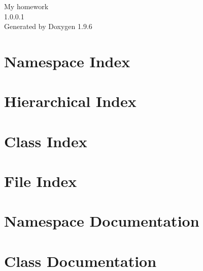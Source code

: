 \documentclass[twoside]{book}
\newcommand{\+}{\discretionary{\mbox{\scriptsize$\hookleftarrow$}}{}{}}
\newcommand{\clearemptydoublepage}{%
    \newpage{\pagestyle{empty}\cleardoublepage}%
  }
\begin{document}
  \raggedbottom
    \hypersetup{pageanchor=false,
                bookmarksnumbered=true,
                pdfencoding=unicode
               }
  \begin{titlepage}
  \vspace*{7cm}
  \begin{center}%
  {\Large My homework}\\
  [1ex]\large 1.\+0.\+0.\+1 \\
  \vspace*{1cm}
  {\large Generated by Doxygen 1.9.6}\\
  \end{center}
  \end{titlepage}
  \clearemptydoublepage
  \tableofcontents
  \clearemptydoublepage
  \hypersetup{pageanchor=true}
\chapter{Namespace Index}

\chapter{Hierarchical Index}

\chapter{Class Index}

\chapter{File Index}

\chapter{Namespace Documentation}

\chapter{Class Documentation}


\end{document}
